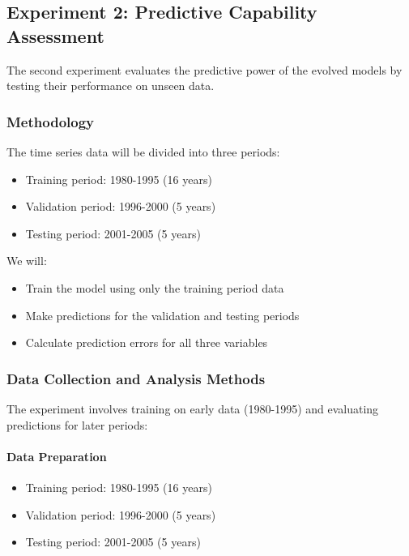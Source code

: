 \subsection{Experiment 2: Predictive Capability Assessment}

The second experiment evaluates the predictive power of the evolved models by testing their performance on unseen data.

\subsubsection{Methodology}

The time series data will be divided into three periods:
\begin{itemize}
\item Training period: 1980-1995 (16 years)
\item Validation period: 1996-2000 (5 years)
\item Testing period: 2001-2005 (5 years)
\end{itemize}

We will:
\begin{itemize}
\item Train the model using only the training period data
\item Make predictions for the validation and testing periods
\item Calculate prediction errors for all three variables
\end{itemize}

\subsubsection{Data Collection and Analysis Methods}

The experiment involves training on early data (1980-1995) and evaluating predictions for later periods:

\paragraph{Data Preparation}
\begin{itemize}
\item Training period: 1980-1995 (16 years)
\item Validation period: 1996-2000 (5 years)
\item Testing period: 2001-2005 (5 years)
\end{itemize}

